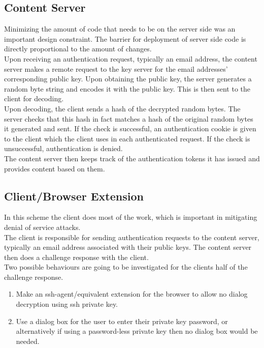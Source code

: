 \documentclass[11pt]{article}
\begin{document}
\subsection{Content Server} \label{sec:sol_server}
Minimizing the amount of code that needs to be on the server side was an important design constraint. The barrier for deployment of server side code is directly proportional to the amount of changes. \\
Upon receiving an authentication request, typically an email address, the content server makes a remote request to the key server for the email addresses' corresponding public key. Upon obtaining the public key, the server generates a random byte string and encodes it with the public key. This is then sent to the client for decoding. \\
Upon decoding, the client sends a hash of the decrypted random bytes. The server checks that this hash in fact matches a hash of the original random bytes it generated and sent. If the check is successful, an authentication cookie is given to the client which the client uses in each authenticated request. If the check is unsuccessful, authentication is denied. \\
The content server then keeps track of the authentication tokens it has issued and provides content based on them.

\subsection{Client/Browser Extension} \label{sec:sol_client}
In this scheme the client does most of the work, which is important in mitigating denial of service attacks.  \\
The client is responsible for sending authentication requests to the content server, typically an email address associated with their public keys. The content server then does a challenge response with the client. \\
Two possible behaviours are going to be investigated for the clients half of the challenge response. \\
\begin{enumerate}
	\item Make an ssh-agent/equivalent extension for the browser to allow no dialog decryption using ssh private key.
	\item Use a dialog box for the user to enter their private key password, or alternatively if using a password-less private key then no dialog box would be needed.
\end{enumerate}
\end{document}
